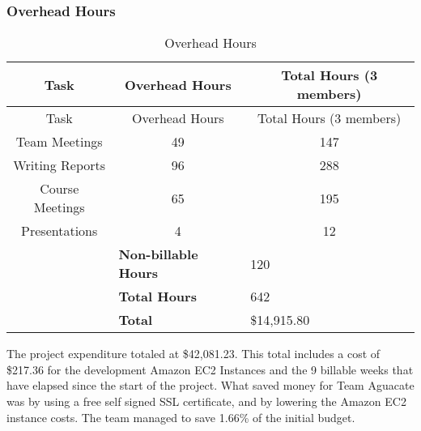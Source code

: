 \subsubsection{Overhead Hours}

\setlength{\extrarowheight}{1.5pt}
  \begin{longtable}{|c|c|c|}
 \caption{Overhead Hours\label{overheadHours}} \\
   \hline
  
  \centering Task & Overhead Hours & Total Hours (3 members) \\
  \hline \hline \endfirsthead
  
     \hline

	\centering Task & Overhead Hours & Total Hours (3 members) \\
	\hline \hline \endhead

 \endfoot  

	Team Meetings & 49 & 147 \\ \hline
	Writing Reports & 96 & 288 \\ \hline
	Course Meetings & 65 & 195 \\ \hline	  
	Presentations & 4 & 12 \\ \hline
  \multicolumn{1}{l}{}      & \multicolumn{1}{l}{\textbf{Non-billable Hours}} & \multicolumn{1}{l}{120}  \\
  \multicolumn{1}{l}{}      & \multicolumn{1}{l}{\textbf{Total Hours}} & \multicolumn{1}{l}{642}  \\
  \multicolumn{1}{l}{}      & \multicolumn{1}{l}{\textbf{Total}} & \multicolumn{1}{l}{\$14,915.80}
    \end{longtable}
    
The project expenditure totaled at \$42,081.23. This total
includes a cost of \$217.36 for the development Amazon EC2 Instances and the 9 billable weeks that have elapsed since the start of the project. What saved money for Team Aguacate was by using a free self signed SSL certificate, and by lowering the Amazon EC2 instance costs. The team managed to save 1.66\% of the initial budget.
